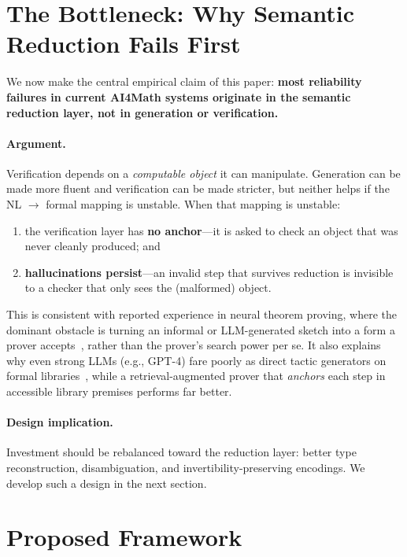 \documentclass[11pt]{article}
\begin{document}
\section{The Bottleneck: Why Semantic Reduction Fails First}
\label{sec:bottleneck}

We now make the central empirical claim of this paper: \textbf{most reliability
failures in current AI4Math systems originate in the semantic reduction layer, not in
generation or verification.}

\paragraph{Argument.}
Verification depends on a \emph{computable object} it can manipulate. Generation can be
made more fluent and verification can be made stricter, but neither helps if the NL
$\rightarrow$ formal mapping is unstable. When that mapping is unstable:
\begin{enumerate}
    \item the verification layer has \textbf{no anchor}---it is asked to check an
          object that was never cleanly produced; and
    \item \textbf{hallucinations persist}---an invalid step that survives reduction is
          invisible to a checker that only sees the (malformed) object.
\end{enumerate}
This is consistent with reported experience in neural theorem proving, where the
dominant obstacle is turning an informal or LLM-generated sketch into a form a prover
accepts~\cite{jiang2023draft,yang2023leandojo}, rather than the prover's search power
per se. It also explains why even strong LLMs (e.g., GPT-4) fare poorly as direct
tactic generators on formal libraries~\cite{yang2023leandojo}, while a retrieval-augmented
prover that \emph{anchors} each step in accessible library premises performs far better.

\paragraph{Design implication.}
Investment should be rebalanced toward the reduction layer: better type reconstruction,
disambiguation, and invertibility-preserving encodings. We develop such a design in the
next section.

\section{Proposed Framework}
\label{sec:framework}
\end{document}
